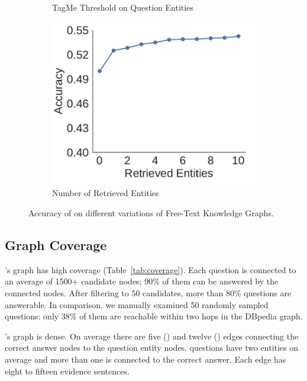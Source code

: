 \begin{figure}[t]
\begin{subfigure}{0.3\textwidth}
        \centering
        \caption{TagMe Threshold on Question Entities}
    \end{subfigure}
    \begin{subfigure}{0.3\textwidth}
        \includegraphics[width=\textwidth]{2020_www_delft/figures/ESAccu.pdf}
        \centering
        \caption{Number of Retrieved Entities}
    \end{subfigure}
\caption{Accuracy of \name{} on different variations of Free-Text Knowledge Graphs.
\label{fig:analysis}
}
\end{figure}

\subsection{Graph Coverage}
\label{sec:coverage}

\name{}'s graph has high coverage (Table~\ref{tab:coverage}).  
Each question is connected to an average of 1500+ candidate nodes; 90\%
of them can be answered by the connected nodes.
%
After filtering to $50$ candidates, more than 80\% questions are
answerable.
%
In comparison, we manually examined 50 randomly sampled \qblink{}
questions: only 38\% of them are reachable within two hops in the
DBpedia graph.

\name{}'s graph is dense.
%
On average there are five (\qblink{}) and twelve (\qanta{}) edges connecting the
correct answer nodes to the question entity nodes.
%
\triviaqa{} questions have two entities on average and more than one
is connected to the correct answer.  Each edge has eight to fifteen
evidence sentences.

